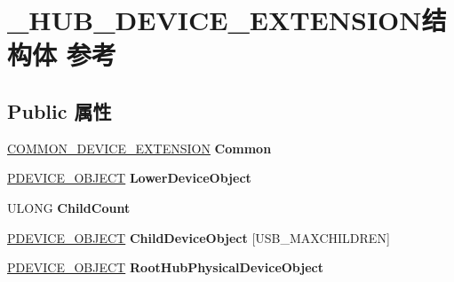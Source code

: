 \hypertarget{struct___h_u_b___d_e_v_i_c_e___e_x_t_e_n_s_i_o_n}{}\section{\+\_\+\+H\+U\+B\+\_\+\+D\+E\+V\+I\+C\+E\+\_\+\+E\+X\+T\+E\+N\+S\+I\+O\+N结构体 参考}
\label{struct___h_u_b___d_e_v_i_c_e___e_x_t_e_n_s_i_o_n}
\subsection*{Public 属性}
\begin{DoxyCompactItemize}
\item 
\mbox{\label{struct___h_u_b___d_e_v_i_c_e___e_x_t_e_n_s_i_o_n_a3bbf5dd22de422e8f70d76dd732f854e}} 
\hyperlink{struct_c_o_m_m_o_n___d_e_v_i_c_e___e_x_t_e_n_s_i_o_n}{C\+O\+M\+M\+O\+N\+\_\+\+D\+E\+V\+I\+C\+E\+\_\+\+E\+X\+T\+E\+N\+S\+I\+ON} {\bfseries Common}
\item 
\mbox{\label{struct___h_u_b___d_e_v_i_c_e___e_x_t_e_n_s_i_o_n_a578309a39a472a18b8f9704d15b19b75}} 
\hyperlink{struct___d_e_v_i_c_e___o_b_j_e_c_t}{P\+D\+E\+V\+I\+C\+E\+\_\+\+O\+B\+J\+E\+CT} {\bfseries Lower\+Device\+Object}
\item 
\mbox{\label{struct___h_u_b___d_e_v_i_c_e___e_x_t_e_n_s_i_o_n_a29efedb4ac32bb6f0c39eb588408de71}} 
U\+L\+O\+NG {\bfseries Child\+Count}
\item 
\mbox{\label{struct___h_u_b___d_e_v_i_c_e___e_x_t_e_n_s_i_o_n_a20cc5a9133c03b609cdafe3c706f2647}} 
\hyperlink{struct___d_e_v_i_c_e___o_b_j_e_c_t}{P\+D\+E\+V\+I\+C\+E\+\_\+\+O\+B\+J\+E\+CT} {\bfseries Child\+Device\+Object} \mbox{[}U\+S\+B\+\_\+\+M\+A\+X\+C\+H\+I\+L\+D\+R\+EN\mbox{]}
\item 
\mbox{\label{struct___h_u_b___d_e_v_i_c_e___e_x_t_e_n_s_i_o_n_af88c5e98a59162c8182d4cb022a7cf88}} 
\hyperlink{struct___d_e_v_i_c_e___o_b_j_e_c_t}{P\+D\+E\+V\+I\+C\+E\+\_\+\+O\+B\+J\+E\+CT} {\bfseries Root\+Hub\+Physical\+Device\+Object}

\end{DoxyCompactItemize}
